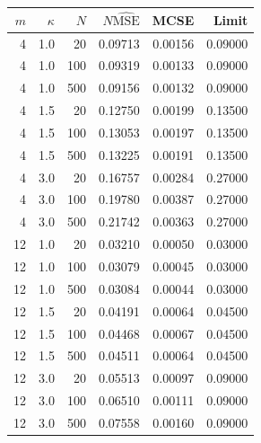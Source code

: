 \begin{longtable}{rrrrrr}
\toprule
$m$ & $\kappa$ & $N$ & $N\widehat{\mathrm{MSE}}$ & MCSE & Limit \\
\midrule
\endhead
4 & 1.0 & 20 & 0.09713 & 0.00156 & 0.09000\\
4 & 1.0 & 100 & 0.09319 & 0.00133 & 0.09000\\
4 & 1.0 & 500 & 0.09156 & 0.00132 & 0.09000\\
4 & 1.5 & 20 & 0.12750 & 0.00199 & 0.13500\\
4 & 1.5 & 100 & 0.13053 & 0.00197 & 0.13500\\
4 & 1.5 & 500 & 0.13225 & 0.00191 & 0.13500\\
4 & 3.0 & 20 & 0.16757 & 0.00284 & 0.27000\\
4 & 3.0 & 100 & 0.19780 & 0.00387 & 0.27000\\
4 & 3.0 & 500 & 0.21742 & 0.00363 & 0.27000\\
12 & 1.0 & 20 & 0.03210 & 0.00050 & 0.03000\\
12 & 1.0 & 100 & 0.03079 & 0.00045 & 0.03000\\
12 & 1.0 & 500 & 0.03084 & 0.00044 & 0.03000\\
12 & 1.5 & 20 & 0.04191 & 0.00064 & 0.04500\\
12 & 1.5 & 100 & 0.04468 & 0.00067 & 0.04500\\
12 & 1.5 & 500 & 0.04511 & 0.00064 & 0.04500\\
12 & 3.0 & 20 & 0.05513 & 0.00097 & 0.09000\\
12 & 3.0 & 100 & 0.06510 & 0.00111 & 0.09000\\
12 & 3.0 & 500 & 0.07558 & 0.00160 & 0.09000\\
\bottomrule
\end{longtable}
